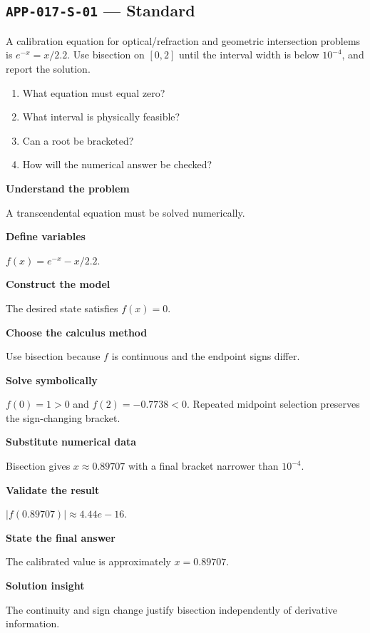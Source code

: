 \documentclass[11pt]{book}
\newcommand{\pid}[1]{\texttt{#1}}
\begin{document}
\subsection*{\pid{APP-017-S-01} — Standard}
\begin{problembox}
A calibration equation for optical/refraction and geometric intersection problems is $e^{-x}=x/2.2$. Use bisection on $[0,2]$ until the interval width is below $10^{-4}$, and report the solution.
\end{problembox}
\begin{promptbox}\begin{enumerate}
\item What equation must equal zero?
\item What interval is physically feasible?
\item Can a root be bracketed?
\item How will the numerical answer be checked?
\end{enumerate}\end{promptbox}
\begin{solutionbox}
\textbf{Understand the problem}\par A transcendental equation must be solved numerically.\par\medskip
\textbf{Define variables}\par $f(x)=e^{-x}-x/2.2$.\par\medskip
\textbf{Construct the model}\par The desired state satisfies $f(x)=0$.\par\medskip
\textbf{Choose the calculus method}\par Use bisection because $f$ is continuous and the endpoint signs differ.\par\medskip
\textbf{Solve symbolically}\par $f(0)=1>0$ and $f(2)=-0.7738<0$. Repeated midpoint selection preserves the sign-changing bracket.\par\medskip
\textbf{Substitute numerical data}\par Bisection gives $x\approx 0.89707$ with a final bracket narrower than $10^{-4}$.\par\medskip
\textbf{Validate the result}\par $|f(0.89707)|\approx 4.44e-16$.\par\medskip
\textbf{State the final answer}\par The calibrated value is approximately $x=0.89707$.\par\medskip
\textbf{Solution insight}\par The continuity and sign change justify bisection independently of derivative information.\par\medskip
\end{solutionbox}
\end{document}
